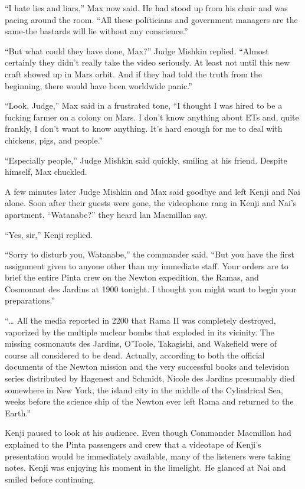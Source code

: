 \documentclass[]{article}
\begin{document}
{“I hate lies and liars,” Max now said.  He had stood up from his chair and was pacing around the room.  “All these politicians and government managers are the same-the bastards will lie without any conscience.”

“But what could they have done, Max?” Judge Mishkin replied.  “Almost certainly they didn’t really take the video seriously.  At least not until this new craft showed up in Mars orbit.  And if they had told the truth from the beginning, there would have been worldwide panic.”

“Look, Judge,” Max said in a frustrated tone, “I thought I was hired to be a fucking farmer on a colony on Mars.  I don’t know anything about ETs and, quite frankly, I don’t want to know anything.  It’s hard enough for me to deal with chickens, pigs, and people.”

“Especially people,” Judge Mishkin said quickly, smiling at his friend.  Despite himself, Max chuckled.

A few minutes later Judge Mishkin and Max said goodbye and left Kenji and Nai alone.  Soon after their guests were gone, the videophone rang in Kenji and Nai’s apartment.  “Watanabe?” they heard lan Macmillan say.

“Yes, sir,” Kenji replied.

“Sorry to disturb you, Watanabe,” the commander said.  “But you have the first assignment given to anyone other than my immediate staff.  Your orders are to brief the entire Pinta crew on the Newton expedition, the Ramas, and Cosmonaut des Jardins at 1900 tonight.  I thought you might want to begin your preparations.”

“… All the media reported in 2200 that Rama II was completely destroyed, vaporized by the multiple nuclear bombs that exploded in its vicinity.  The missing cosmonauts des Jardins, O’Toole, Takagishi, and Wakefield were of course all considered to be dead.  Actually, according to both the official documents of the Newton mission and the very successful books and television series distributed by Hagenest and Schmidt, Nicole des Jardins presumably died somewhere in New York, the island city in the middle of the Cylindrical Sea, weeks before the science ship of the Newton ever left Rama and returned to the Earth.”

Kenji paused to look at his audience.  Even though Commander Macmillan had explained to the Pinta passengers and crew that a videotape of Kenji’s presentation would be immediately available, many of the listeners were taking notes.  Kenji was enjoying his moment in the limelight.  He glanced at Nai and smiled before continuing.

}
\end{document}
